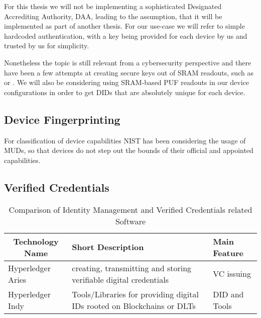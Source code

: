 For this thesis we will not be implementing a sophisticated Designated Accrediting Authority, DAA, leading to the
assumption, that it will be implemented as part of another thesis. For our use-case we will refer to simple
hardcoded authentication, with a key being provided for each device by us and trusted by us for simplicity.


Nonetheless the topic is still relevant from a cybersecurity perspective and there have been a few attempts at creating
secure keys out of SRAM readouts, such as \cite{vinagrero2023sram} or \cite{Niya_Jeffrey_Stiller_2020}.
We will also be considering using SRAM-based PUF readouts in our device configurations in order to get DIDs that are
absolutely unique for each device.

\subsection{Device Fingerprinting} %
\label{sub:Device Fingerprinting}

For classification of device capabilities NIST has been considering the usage of MUDs, so that devices do not step out
the bounds of their official and appointed capabilities. \cite{dodson2021securing}



\subsection{Verified Credentials} %
\label{sub:Verified Credentials}

\begin{table}
	\caption{Comparison of Identity Management and Verified Credentials related Software}
	\label{tab:Comparison of Identity Management and Verified Credentials related Software}
	\begin{center}
		\begin{tabular}[c]{|l|p{7cm}|l|}
			\hline
			\multicolumn{1}{|c|}{\textbf{Technology Name}} & Short Description                             &
			Main Feature                                                                                     \\
			\hline
			Hyperledger Aries \cite{hyperledger:wiki}      & creating, transmitting and storing verifiable
			digital credentials                            & VC issuing                                      \\
			\hline
			Hyperledger Indy \cite{hyperledger:wiki}       & Tools/Libraries for providing digital IDs
			rooted on Blockchains or DLTs                  & DID and Tools                                   \\
			\hline
		\end{tabular}
	\end{center}
\end{table}


